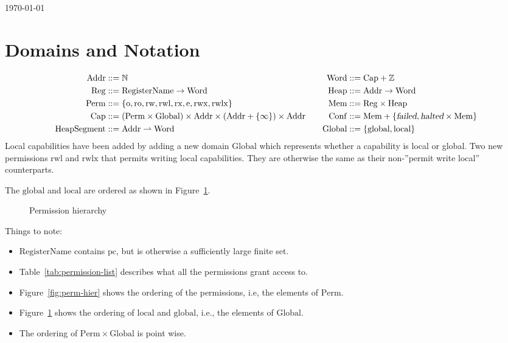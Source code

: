 \documentclass[a4paper]{article}
\newcommand{\parfun}{\rightharpoonup}
\newcommand{\pcreg}{\mathrm{pc}}
\newcommand{\failed}{\textsl{failed}}
\newcommand{\halted}{\textsl{halted}}
\newcommand{\plaindom}[1]{\mathrm{#1}}
\newcommand{\Caps}{\plaindom{Cap}}
\newcommand{\Words}{\plaindom{Word}}
\newcommand{\Addrs}{\plaindom{Addr}}
\newcommand{\Mems}{\plaindom{Mem}}
\newcommand{\RegName}{\plaindom{RegisterName}}
\newcommand{\Regs}{\plaindom{Reg}}
\newcommand{\Heaps}{\plaindom{Heap}}
\newcommand{\HeapSegments}{\plaindom{HeapSegment}}
\newcommand{\Confs}{\plaindom{Conf}}
\newcommand{\nats}{\mathbb{N}}
\newcommand{\ints}{\mathbb{Z}}
\newcommand{\Perms}{\plaindom{Perm}}
\newcommand{\Globals}{\plaindom{Global}}
\newcommand{\plainperm}[1]{\mathrm{#1}}
\newcommand{\noperm}{\plainperm{o}}
\newcommand{\readonly}{\plainperm{ro}}
\newcommand{\readwrite}{\plainperm{rw}}
\newcommand{\exec}{\plainperm{rx}}
\newcommand{\entry}{\plainperm{e}}
\newcommand{\rwx}{\plainperm{rwx}}
\newcommand{\readwritel}{\plainperm{rwl}}
\newcommand{\rwlx}{\plainperm{rwlx}}
\newcommand{\local}{\plainperm{local}}
\newcommand{\glob}{\plainperm{global}}
\begin{document}
\begin{flushright}
\today
\end{flushright}
\section{Domains and Notation}
\begin{align*}
\Addrs &::= \nats & & &
\Words &::= \Caps + \ints \\
\Regs  &::= \RegName \rightarrow \Words & & &
\Heaps &::= \Addrs \rightarrow \Words \\
\Perms &::= \{ \noperm, \readonly, \readwrite, \readwritel, \exec, \entry, \rwx, \rwlx\} & & &
\Mems  &::= \Regs \times \Heaps \\
\Caps  &::= (\Perms \times \Globals) \times \Addrs \times (\Addrs + \{ \infty \}) \times \Addrs & & &
\Confs &::= \Mems + \{\failed, \halted \times \Mems\} \\
\HeapSegments &::= \Addrs \parfun \Words & & &
\Globals & ::= \{\glob, \local \}
\end{align*}
Local capabilities have been added by adding a new domain $\Globals$ which represents whether a capability is local or global. Two new permissions $\readwritel$ and $\rwlx$ that permits writing local capabilities. They are otherwise the same as their non-''permit write local'' counterparts.

The $\glob$ and $\local$ are ordered as shown in Figure~\ref{fig:glob-hier}.
\begin{figure}[!h]
  \centering
\caption{Permission hierarchy}
\label{fig:glob-hier}
\end{figure}

Things to note:
\begin{itemize}
\item $\RegName$ contains $\pcreg$, but is otherwise a sufficiently
  large finite set.
\item Table~\ref{tab:permission-list} describes what all the permissions grant access to.
\item Figure~\ref{fig:perm-hier} shows the ordering of the permissions, i.e, the elements of $\Perms$.
\item Figure~\ref{fig:glob-hier} shows the ordering of $\local$ and $\glob$, i.e., the elements of $\Globals$.
\item The ordering of $\Perms \times \Globals$ is point wise.
\end{itemize}
\end{document}
